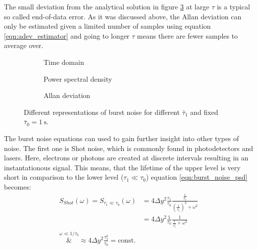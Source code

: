 The small deviation from the analytical solution in figure \ref{fig:burst_noise_adev}  at large $\tau$ is a typical so called end-of-data error. As it was discussed above, the Allan deviation can only be estimated given a limited number of samples using equation \ref{eqn:adev_estimator} and going to longer $\tau$ means there are fewer samples to average over.

\begin{figure}[ht]
    \centering
    \begin{subfigure}{0.8\linewidth}
        \centering
        \scalebox{1}{%
            
        } %
        \caption{Time domain}
        \label{fig:burst_noise_time}
    \end{subfigure}
    \begin{subfigure}{0.8\linewidth}
        \centering
        \scalebox{1}{%
            
        } %
        \caption{Power spectral density}
        \label{fig:burst_noise_psd}
    \end{subfigure}
    \begin{subfigure}{0.8\linewidth}
        \centering
        \scalebox{1}{%
            
        } %
        \caption{Allan deviation}
        \label{fig:burst_noise_adev}
    \end{subfigure}
    \caption{Different representations of burst noise for different $\bar \tau_1$ and fixed $\bar \tau_0 = \qty{1}{\s}$.}
    \label{fig:burst_noise_simulated}
\end{figure}

The burst noise equations can used to gain further insight into other types of noise. The first one is Shot noise, which is commonly found in photodetectors and lasers. Here, electrons or photons are created at discrete intervals resulting in an instantationous signal. This means, that the lifetime of the upper level is very short in comparison to the lower level ($\tau_1 \ll \tau_0$) equation \ref{eqn:burst_noise_psd} becomes:
\begin{align}
    S_{Shot}(\omega) = S_{\tau_1 \ll \tau_0}(\omega) &= 4 \Delta y^2 \frac{\tau_1}{\tau_0} \frac{\frac{1}{\bar \tau_1}}{\left(\frac{1}{\bar \tau_1}\right)^2 + \omega^2}\nonumber\\
    &= 4 \Delta y^2 \frac{1}{\tau_0} \frac{1}{\frac{1}{\tau_1^2}+\omega^2}\\
    \overset{\omega \ll 1/\tau_0}&{\approx} 4 \Delta y^2 \frac{\tau_1^2}{\tau_0} = \text{const.}
\end{align}

